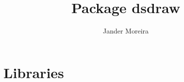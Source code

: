 \documentclass[10pt,a4paper]{article}
\title{Package \textsf{dsdraw}}
\author{Jander Moreira}
\begin{document}
\sloppy
\maketitle

%
%
%
%
%


\section{Libraries}




\end{document}
